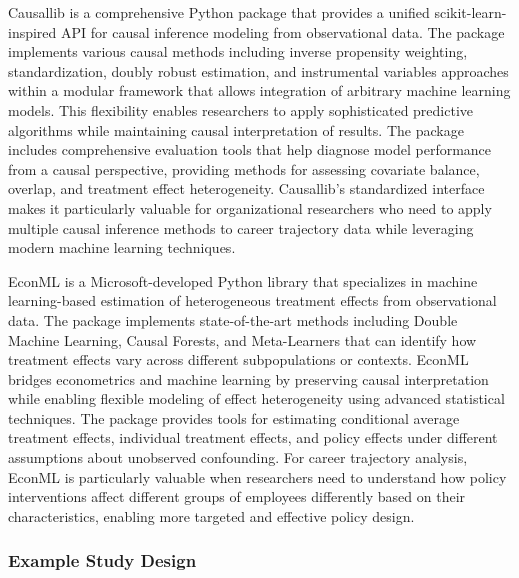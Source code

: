 \documentclass[main.tex]{subfiles}
\begin{document}
Causallib is a comprehensive Python package that provides a unified scikit-learn-inspired API for causal inference modeling from observational data\parencite{causallib}. The package implements various causal methods including inverse propensity weighting, standardization, doubly robust estimation, and instrumental variables approaches within a modular framework that allows integration of arbitrary machine learning models. This flexibility enables researchers to apply sophisticated predictive algorithms while maintaining causal interpretation of results. The package includes comprehensive evaluation tools that help diagnose model performance from a causal perspective, providing methods for assessing covariate balance, overlap, and treatment effect heterogeneity. Causallib's standardized interface makes it particularly valuable for organizational researchers who need to apply multiple causal inference methods to career trajectory data while leveraging modern machine learning techniques.


EconML is a Microsoft-developed Python library that specializes in machine learning-based estimation of heterogeneous treatment effects from observational data\parencite{econml}. The package implements state-of-the-art methods including Double Machine Learning, Causal Forests, and Meta-Learners that can identify how treatment effects vary across different subpopulations or contexts. EconML bridges econometrics and machine learning by preserving causal interpretation while enabling flexible modeling of effect heterogeneity using advanced statistical techniques. The package provides tools for estimating conditional average treatment effects, individual treatment effects, and policy effects under different assumptions about unobserved confounding. For career trajectory analysis, EconML is particularly valuable when researchers need to understand how policy interventions affect different groups of employees differently based on their characteristics, enabling more targeted and effective policy design.

\subsubsection{Example Study Design}

\end{document}
